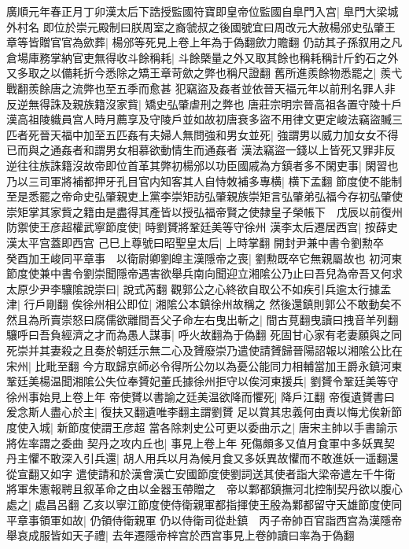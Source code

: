 廣順元年春正月丁卯漢太后下誥授監國符寶即皇帝位監國自臯門入宫|{
	臯門大梁城外村名}
即位於崇元殿制曰朕周室之裔虢叔之後國號宜曰周改元大赦楊邠史弘肇王章等皆贈官官為歛葬|{
	楊邠等死見上卷上年為于偽翻歛力贍翻}
仍訪其子孫叙用之凡倉場庫務掌納官吏無得收斗餘稱耗|{
	斗餘槩量之外又取其餘也稱耗稱計斤釣石之外又多取之以備耗折今悉除之矯王章苛歛之弊也稱尺證翻}
舊所進羨餘物悉罷之|{
	羨弋戰翻羨餘唐之流弊也至五季而愈甚}
犯竊盜及姦者並依晉天福元年以前刑名罪人非反逆無得誅及親族籍沒家貲|{
	矯史弘肇虐刑之弊也}
唐莊宗明宗晉高祖各置守陵十戶漢高祖陵軄員宫人時月薦享及守陵戶並如故初唐衰多盜不用律文更定峻法竊盜贓三匹者死晉天福中加至五匹姦有夫婦人無問強和男女並死|{
	強謂男以威力加女女不得已而與之通姦者和謂男女相慕欲動情生而通姦者}
漢法竊盜一錢以上皆死又罪非反逆往往族誅籍沒故帝即位首革其弊初楊邠以功臣國戚為方鎮者多不閑吏事|{
	閑習也}
乃以三司軍將補都押牙孔目官内知客其人自恃敇補多專横|{
	横下孟翻}
節度使不能制至是悉罷之帝命史弘肇親吏上黨李崇矩訪弘肇親族崇矩言弘肇弟弘福今存初弘肇使崇矩掌其家貲之籍由是盡得其產皆以授弘福帝賢之使隸皇子榮帳下　戊辰以前復州防禦使王彦超權武寧節度使|{
	時劉贇將鞏廷美等守徐州}
漢李太后遷居西宫|{
	按薛史漢太平宫蓋即西宫}
己巳上尊號曰昭聖皇太后|{
	上時掌翻}
開封尹兼中書令劉勲卒　癸酉加王峻同平章事　以衛尉卿劉皥主漢隱帝之喪|{
	劉勲既卒它無親屬故也}
初河東節度使兼中書令劉崇聞隱帝遇害欲舉兵南向聞迎立湘隂公乃止曰吾兒為帝吾又何求太原少尹李驤隂說崇曰|{
	說式芮翻}
觀郭公之心終欲自取公不如疾引兵逾太行據孟津|{
	行戶剛翻}
俟徐州相公即位|{
	湘隂公本鎮徐州故稱之}
然後還鎮則郭公不敢動矣不然且為所賣崇怒曰腐儒欲離間吾父子命左右曳出斬之|{
	間古莧翻曳讀曰拽音羊列翻}
驤呼曰吾負經濟之才而為愚人謀事|{
	呼火故翻為于偽翻}
死固甘心家有老妻願與之同死崇并其妻殺之且奏於朝廷示無二心及贇廢崇乃遣使請贇歸晉陽詔報以湘隂公比在宋州|{
	比毗至翻}
今方取歸京師必令得所公勿以為憂公能同力相輔當加王爵永鎮河東鞏廷美楊温聞湘隂公失位奉贇妃董氏據徐州拒守以俟河東援兵|{
	劉贇令鞏廷美等守徐州事始見上卷上年}
帝使贇以書諭之廷美温欲降而懼死|{
	降戶江翻}
帝復遺贇書曰爰念斯人盡心於主|{
	復扶又翻遺唯李翻主謂劉贇}
足以賞其忠義何由責以悔尤俟新節度使入城|{
	新節度使謂王彦超}
當各除刺史公可更以委曲示之|{
	唐宋主帥以手書諭示將佐率謂之委曲}
契丹之攻内丘也|{
	事見上卷上年}
死傷頗多又值月食軍中多妖異契丹主懼不敢深入引兵還|{
	胡人用兵以月為候月食又多妖異故懼而不敢進妖一遥翻還從宣翻又如字}
遣使請和於漢會漢亡安國節度使劉詞送其使者詣大梁帝遣左千牛衛將軍朱憲報聘且叙革命之由以金器玉帶贈之　帝以鄴都鎮撫河北控制契丹欲以腹心處之|{
	處昌呂翻}
乙亥以寧江節度使侍衛親軍都指揮使王殷為鄴都留守天雄節度使同平章事領軍如故|{
	仍領侍衛親軍}
仍以侍衛司從赴鎮　丙子帝帥百官詣西宫為漢隱帝舉哀成服皆如天子禮|{
	去年遷隱帝梓宫於西宫事見上卷帥讀曰率為于偽翻}

